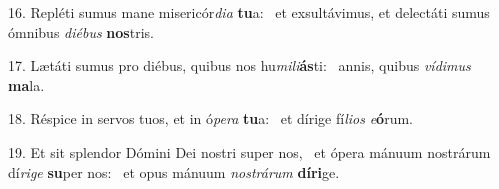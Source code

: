 16. Repléti sumus mane misericór\textit{di}\textit{a} \textbf{tu}a: \ast\  et exsultávimus, et delectáti sumus ómnibus \textit{di}\textit{é}\textit{bus} \textbf{nos}tris.\

17. Lætáti sumus pro diébus, quibus nos hu\textit{mi}\textit{li}\textbf{ás}ti: \ast\  annis, quibus \textit{ví}\textit{di}\textit{mus} \textbf{ma}la.\

18. Réspice in servos tuos, et in ó\textit{pe}\textit{ra} \textbf{tu}a: \ast\  et dírige fí\textit{li}\textit{os} \textit{e}\textbf{ó}rum.\

19. Et sit splendor Dómini Dei nostri super nos, \dag\  et ópera mánuum nostrárum dí\textit{ri}\textit{ge} \textbf{su}per nos: \ast\  et opus mánuum \textit{nos}\textit{trá}\textit{rum} \textbf{dí}\textbf{ri}ge.\

